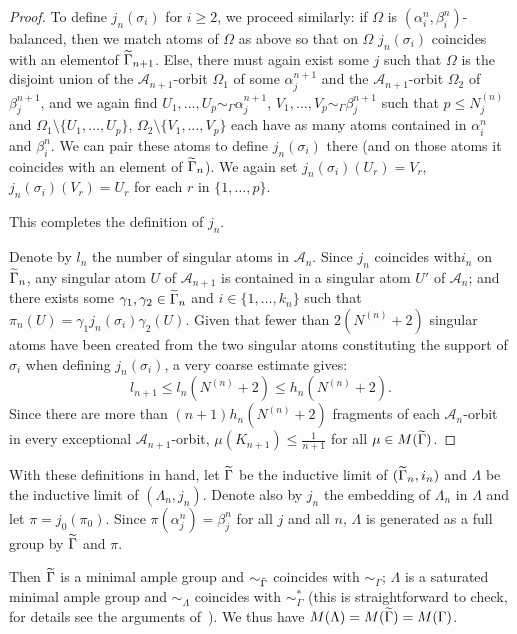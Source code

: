 \documentclass[AHL,Unicode]{cedram}
\newcommand{\mcA}{\mathcal{A}}
\let\oldtilde\tilde
\renewcommand*{\tilde}[1]{\mathchoice{\widetilde{#1}}{\widetilde{#1}}{\oldtilde{#1}}{\oldtilde{#1}}}
\begin{document}
\begin{proof}
To define $j_n(\sigma_i)$ for $i \ge 2$, we proceed similarly: if $\Omega$ is $(\alpha_i^n,\beta_i^n)$-balanced, then we match atoms of $\Omega$ as above so that on $\Omega$ $j_n(\sigma_i)$ coincides with an element\linebreak of $\tilde \Gamma_{n+1}$. Else, there must again exist some $j$ such that $\Omega$ is the disjoint union of the $\mcA_{n+1}$-orbit $\Omega_1$ of some $\alpha_j^{n+1}$ and the $\mcA_{n+1}$-orbit $\Omega_2$ of $\beta_j^{n+1}$, and we again find $U_1,\dots,U_p \sim_\Gamma \alpha_j^{n+1}$, $V_1,\dots,V_p \sim_\Gamma \beta_j^{n+1}$ such that $p \le N_j^{(n)}$ and $\Omega_1 \setminus \{U_1,\dots,U_p\}$, $\Omega_2 \setminus\{ V_1,\dots,V_p\}$ each have as many atoms contained in $\alpha_i^n$ and $\beta_i^n$. We can pair these atoms to define $j_n(\sigma_i)$ there (and on those atoms it coincides with an element of $\tilde \Gamma_n$). We again set $j_n(\sigma_i)(U_r)=V_r$, $j_n(\sigma_i)(V_r)=U_r$ for each $r$ in $\{1,\dots,p\}$.

This completes the definition of $j_n$.

\pagebreak
Denote by $l_n$ the number of singular atoms in $\mcA_n$. Since $j_n$ coincides with\linebreak $i_n$ on $\tilde \Gamma_n$, any singular atom $U$ of $\mcA_{n+1}$ is contained in a singular atom $U'$ of $\mcA_n$; and there exists some $\gamma_1,\gamma_2 \in \tilde \Gamma_n$ and $i \in \{1,\dots,k_n\}$ such that $\pi_n(U)= \gamma_1 j_n(\sigma_i) \gamma_2(U)$. Given that fewer than $2(N^{(n)}+2)$ singular atoms have been created from the two singular atoms constituting the support of $\sigma_i$ when defining $j_n(\sigma_i)$, a very coarse estimate gives:
\[
l_{n+1} \le l_n (N^{(n)}+2) \le h_n (N^{(n)}+2).
\]
Since there are more than $(n+1) h_n (N^{(n)}+2)$ fragments of each $\mcA_n$-orbit in every exceptional $\mcA_{n+1}$-orbit, $\mu(K_{n+1}) \le \frac{1}{n+1}$ for all $\mu \in M(\tilde \Gamma)$.
\end{proof}

With these definitions in hand, let $\tilde \Gamma$ be the inductive limit of $(\tilde \Gamma_n,i_n)$ and $\Lambda$ be the inductive limit of $(\Lambda_n,j_n)$. Denote also by $j_n$ the embedding of $\Lambda_n$ in $\Lambda$ and let $\pi=j_0(\pi_0)$. Since $\pi(\alpha_j^n)=\beta_j^n$ for all $j$ and all $n$, $\Lambda$ is generated as a full group by $\tilde \Gamma$ and $\pi$.

Then $\tilde \Gamma$ is a minimal ample group and $\sim_{\tilde \Gamma}$ coincides with $\sim_\Gamma$; $\Lambda$ is a saturated minimal ample group and $\sim_\Lambda$ coincides with $\sim_\Gamma^*$ (this is straightforward to check, for details see the arguments of~\cite{Melleray2023}). We thus have $M(\Lambda)=M(\tilde \Gamma)=M(\Gamma)$.
\end{document}
